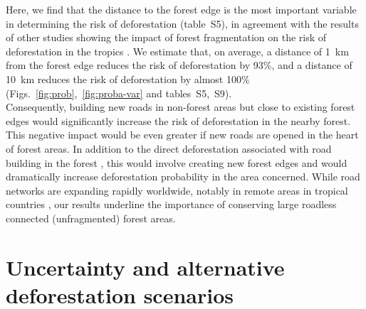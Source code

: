\documentclass[
  12pt,
]{article}
\begin{document}
Here, we find that the distance to the forest edge is the most important variable in determining the risk of deforestation (table~S5), in agreement with the results of other studies showing the impact of forest fragmentation on the risk of deforestation in the tropics \citep{Hansen2020}. We estimate that, on average, a distance of 1~km from the forest edge reduces the risk of deforestation by 93\%, and a distance of 10~km reduces the risk of deforestation by almost 100\% (Figs.~\ref{fig:prob},~\ref{fig:proba-var} and tables~S5,~S9).\\

Consequently, building new roads in non-forest areas but close to existing forest edges would significantly increase the risk of deforestation in the nearby forest. This negative impact would be even greater if new roads are opened in the heart of forest areas. In addition to the direct deforestation associated with road building in the forest \citep{Kleinschroth2017}, this would involve creating new forest edges and would dramatically increase deforestation probability in the area concerned. While road networks are expanding rapidly worldwide, notably in remote areas in tropical countries \citep{Laurance2014}, our results underline the importance of conserving large roadless connected (unfragmented) forest areas.\\

\hypertarget{uncertainty-and-alternative-deforestation-scenarios}{%
\section{Uncertainty and alternative deforestation scenarios}\label{uncertainty-and-alternative-deforestation-scenarios}}
\end{document}
